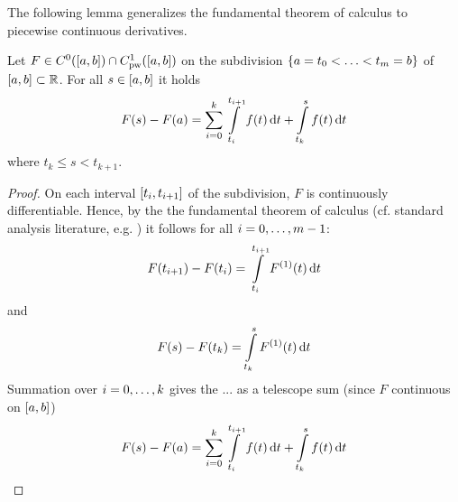     The following lemma generalizes the fundamental theorem of calculus to piecewise continuous derivatives.

    \begin{lemma}[]\label{lm:pc-hauptsatz}
        Let $F\in\Cn[0]{\compactum{a}{b}}{} \cap \Cnpw[1]{\compactum{a}{b}}{}$ on the subdivision $\subdivision{a=t_0}{t_m=b}$ of $\compactum{a}{b}\subset\R$.
        For all $s\in\compactum{a}{b}$ it holds
        \begin{equation*}
            F(s)-F(a) = \sum_{i=0}^k\int\limits_{t_i}^{t_{i+1}}f(t)\dx[t] + \int\limits_{t_k}^s f(t)\dx[t]
        \end{equation*}
        where $t_k\leq s < t_{k+1}$.
    \end{lemma}
    \begin{proof}
        On each interval $\compactum{t_i}{t_{i+1}}$ of the subdivision, $F$ is continuously differentiable. Hence, by the the fundamental theorem of calculus (cf. standard analysis literature, e.g. \cite{Gathmann12GDM,Rudin76PrinciplesAnalysis}) it follows for all $i=\range{0}{m-1}$:
        \begin{equation*}
            F(t_{i+1})-F(t_i) = \int\limits_{t_i}^{t_{i+1}}\D{F}(t)\dx[t]
        \end{equation*}
        and
        \begin{equation*}
            F(s)-F(t_k) = \int\limits_{t_k}^{s}\D{F}(t)\dx[t]
        \end{equation*}
        Summation over $i=\range{0}{k}$ gives the ... as a telescope sum (since $F$ continuous on $\compactum{a}{b}$)
        \begin{equation*}
            F(s)-F(a) = \sum_{i=0}^k\int\limits_{t_i}^{t_{i+1}}f(t)\dx[t] + \int\limits_{t_k}^s f(t)\dx[t]
        \end{equation*}
    \end{proof}



